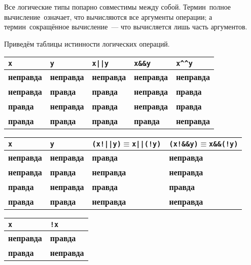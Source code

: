 \documentclass[10pt]{report}
\begin{document}
Все логические типы попарно совместимы между собой. Термин\ \glqq полное вычисление\grqq\ означает, что вычисляются все аргументы операции; а термин\ \glqq сокращённое
вычисление\grqq\ --- что вычисляется лишь часть аргументов.

Приведём таблицы истинности логических операций.
\begin{center}
\vspace{5mm}
\begin{longtable}{|l|l|l|l|l|}  \hline
\texttt{x}          & \texttt{y}        & \texttt{x||y}     & \texttt{x\&\&y}   & \texttt{x\^{ }\^{ }y} \\  \hline
\textbf{неправда}       & \textbf{неправда}     & \textbf{неправда}     & \textbf{неправда}     & \textbf{неправда}         \\  \hline
\textbf{неправда}       & \textbf{правда}   & \textbf{правда}   & \textbf{неправда}     & \textbf{правда}       \\  \hline
\textbf{правда}     & \textbf{неправда}     & \textbf{правда}   & \textbf{неправда}     & \textbf{правда}       \\  \hline
\textbf{правда}     & \textbf{правда}   & \textbf{правда}   & \textbf{правда}   & \textbf{неправда}         \\  \hline
\end{longtable}

\begin{longtable}{|l|l|l|l|}  \hline
\texttt{x}          & \texttt{y}        & \texttt{(x!||y)$\equiv$x||(!y)}   & \texttt{(x!\&\&y)$\equiv$x\&\&(!y)}   \\  \hline
\textbf{неправда}       & \textbf{неправда}     & \textbf{правда}                   & \textbf{неправда}                         \\  \hline
\textbf{неправда}       & \textbf{правда}   & \textbf{неправда}                     & \textbf{неправда}                         \\  \hline
\textbf{правда}     & \textbf{неправда}     & \textbf{правда}                   & \textbf{правда}                       \\  \hline
\textbf{правда}     & \textbf{правда}   & \textbf{неправда}                     & \textbf{неправда}                         \\  \hline
\end{longtable}


\begin{longtable}{|l|l|}  \hline
 \texttt{x}         & \texttt{!x}       \\  \hline
\textbf{неправда}       & \textbf{правда}   \\  \hline
\textbf{правда}     & \textbf{неправда}     \\  \hline
\end{longtable}
\end{center}
\end{document}
